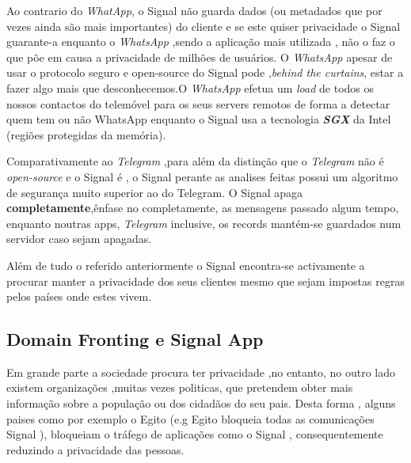 Ao contrario do \textit{WhatApp}, o Signal não guarda dados (ou metadados que por vezes ainda são mais importantes) do cliente e se este quiser privacidade o Signal guarante-a enquanto o \textit{WhatsApp} ,sendo a aplicação mais utilizada , não o faz o que põe em causa a privacidade de milhões de usuários. O \textit{WhatsApp} apesar de usar o protocolo seguro e open-source do Signal pode ,\textit{behind the curtains}, estar a fazer algo mais que desconhecemos.O \textit{WhatsApp} efetua um \textit{load} de todos os nossos contactos do telemóvel para os seus servers remotos de forma a detectar quem tem ou não WhatsApp enquanto o Signal usa a tecnologia \textit{\textbf{SGX}} da Intel (regiões protegidas da memória). 

Comparativamente ao \textit{Telegram} ,para além da distinção que o \textit{Telegram} não é \textit{open-source} e o Signal é , o Signal perante as analises feitas possui um algoritmo de segurança muito superior ao do Telegram.
O Signal apaga \textbf{completamente},ênfase no completamente, as mensagens passado algum tempo, enquanto noutras apps, \textit{Telegram} inclusive, os records mantém-se guardados num servidor caso sejam apagadas.

Além de tudo o referido anteriormente o Signal encontra-se activamente a procurar manter a privacidade dos seus clientes mesmo que sejam impostas regras pelos países onde estes vivem.

\subsection{Domain Fronting e Signal App}
Em grande parte a sociedade procura ter privacidade ,no entanto, no outro lado existem organizações ,muitas vezes politicas, que pretendem obter mais informação sobre a população ou dos cidadãos do seu pais. Desta forma , alguns paises como por exemplo o Egito (e.g Egito bloqueia todas as comunicações Signal \cite{noSignal}), bloqueiam o tráfego de aplicações como o Signal , consequentemente reduzindo a privacidade das pessoas.

